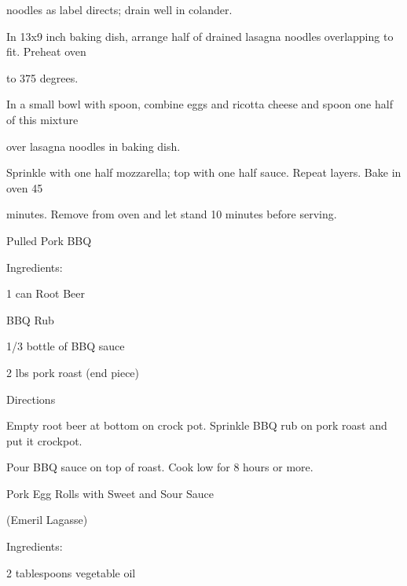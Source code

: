 \documentclass[a4paper,portrait,12pt]{book}
\begin{document}
noodles as label directs; drain well in colander.




In 13x9 inch baking dish, arrange half of drained lasagna noodles overlapping to fit. Preheat oven




to 375 degrees.




In a small bowl with spoon, combine eggs and ricotta cheese and spoon one half of this mixture




over lasagna noodles in baking dish.




Sprinkle with one half mozzarella; top with one half sauce. Repeat layers. Bake in oven 45




minutes. Remove from oven and let stand 10 minutes before serving.







\newpage
Pulled Pork BBQ




Ingredients:




1 can Root Beer




BBQ Rub




1/3 bottle of BBQ sauce




2 lbs pork roast (end piece)




Directions




Empty root beer at bottom on crock pot. Sprinkle BBQ rub on pork roast and put it crockpot.




Pour BBQ sauce on top of roast. Cook low for 8 hours or more.







\newpage
Pork Egg Rolls with Sweet and Sour Sauce




(Emeril Lagasse)




Ingredients:




2 tablespoons vegetable oil
\end{document}
